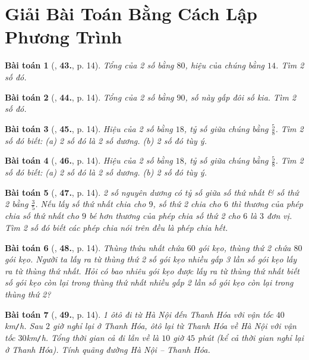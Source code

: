 \documentclass{article}
\numberwithin{equation}{section}
\newtheorem{baitoan}{Bài toán}
\begin{document}
\section{Giải Bài Toán Bằng Cách Lập Phương Trình}

\begin{baitoan}[\cite{SBT_Toan_8_tap_2}, \textbf{43.}, p. 14]
	Tổng của 2 số bằng $80$, hiệu của chúng bằng $14$. Tìm 2 số đó.	
\end{baitoan}

\begin{baitoan}[\cite{SBT_Toan_8_tap_2}, \textbf{44.}, p. 14]
	Tổng của 2 số bằng $90$, số này gấp đôi số kia. Tìm 2 số đó.
\end{baitoan}

\begin{baitoan}[\cite{SBT_Toan_8_tap_2}, \textbf{45.}, p. 14]
	Hiệu của 2 số bằng $18$, tỷ số giữa chúng bằng $\frac{5}{8}$. Tìm 2 số đó biết: (a) 2 số đó là 2 số dương. (b) 2 số đó tùy ý.
\end{baitoan}

\begin{baitoan}[\cite{SBT_Toan_8_tap_2}, \textbf{46.}, p. 14]
	Hiệu của 2 số bằng $18$, tỷ số giữa chúng bằng $\frac{5}{8}$. Tìm 2 số đó biết: (a) 2 số đó là 2 số dương. (b) 2 số đó tùy ý.
\end{baitoan}

\begin{baitoan}[\cite{SBT_Toan_8_tap_2}, \textbf{47.}, p. 14]
	2 số nguyên dương có tỷ số giữa số thứ nhất \& số thứ 2 bằng $\frac{3}{5}$. Nếu lấy số thứ nhất chia cho $9$, số thứ 2 chia cho $6$ thì thương của phép chia số thứ nhất cho $9$ bé hơn thương của phép chia số thứ 2 cho $6$ là $3$ đơn vị. Tìm 2 số đó biết các phép chia nói trên đều là phép chia hết.
\end{baitoan}

\begin{baitoan}[\cite{SBT_Toan_8_tap_2}, \textbf{48.}, p. 14]
	Thùng thứu nhất chứa $60$ gói kẹo, thùng thứ 2 chứa $80$ gói kẹo. Người ta lấy ra từ thùng thứ 2 số gói kẹo nhiều gấp 3 lần số gói kẹo lấy ra từ thùng thứ nhất. Hỏi có bao nhiêu gói kẹo được lấy ra từ thùng thứ nhất biết số gói kẹo còn lại trong thùng thứ nhất nhiều gấp 2 lần số gói kẹo còn lại trong thùng thứ 2?
\end{baitoan}

\begin{baitoan}[\cite{SBT_Toan_8_tap_2}, \textbf{49.}, p. 14]
	1 ôtô đi từ Hà Nội đến Thanh Hóa với vận tốc $40$\emph{km\texttt{/}h}. Sau $2$ giờ nghỉ lại ở Thanh Hóa, ôtô lại từ Thanh Hóa về Hà Nội với vận tốc $30$\emph{km\texttt{/}h}. Tổng thời gian cả đi lẫn về là $10$ giờ $45$ phút (kể cả thời gian nghỉ lại ở Thanh Hóa). Tính quãng đường Hà Nội -- Thanh Hóa.
\end{baitoan}
\end{document}
